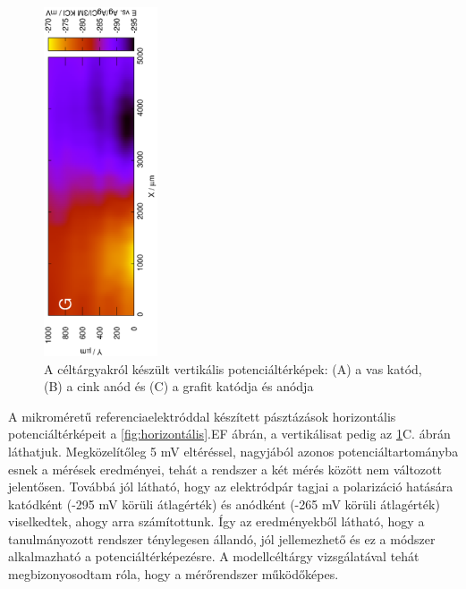 \begin{figure}
\includegraphics[width=0.3\textwidth, angle=-90]{img/mérések/grafit_v.eps}
\caption{A céltárgyakról készült vertikális potenciáltérképek:
(A) a vas katód, (B) a cink anód és (C) a grafit katódja és anódja}
\label{fig:vertikális}
\end{figure}

A mikroméretű referenciaelektróddal készített pásztázások horizontális potenciáltérképeit a \ref{fig:horizontális}.EF ábrán, a vertikálisat pedig az \ref{fig:vertikális}C. ábrán láthatjuk. Megközelítőleg 5 mV eltéréssel, nagyjából azonos potenciáltartományba esnek a mérések eredményei, tehát a rendszer a két mérés között nem változott jelentősen. Továbbá jól látható, hogy az elektródpár tagjai a polarizáció hatására katódként (-295 mV körüli átlagérték) és anódként (-265 mV körüli átlagérték) viselkedtek, ahogy arra számítottunk. Így az eredményekből látható, hogy a tanulmányozott rendszer ténylegesen állandó, jól jellemezhető és ez a módszer alkalmazható a potenciáltérképezésre. A modellcéltárgy vizsgálatával tehát megbizonyosodtam róla, hogy a mérőrendszer működőképes.

